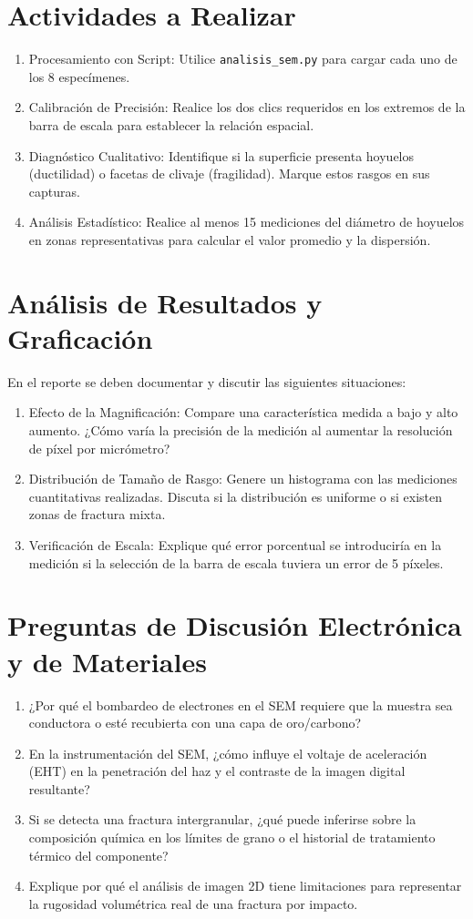 \documentclass[11pt, a4paper]{article}
\begin{document}
\section{Actividades a Realizar}
\begin{enumerate}
    \item Procesamiento con Script: Utilice \texttt{analisis\_sem.py} para cargar cada uno de los 8 especímenes.
    \item Calibración de Precisión: Realice los dos clics requeridos en los extremos de la barra de escala para establecer la relación espacial.
    \item Diagnóstico Cualitativo: Identifique si la superficie presenta hoyuelos (ductilidad) o facetas de clivaje (fragilidad). Marque estos rasgos en sus capturas.
    \item Análisis Estadístico: Realice al menos 15 mediciones del diámetro de hoyuelos en zonas representativas para calcular el valor promedio y la dispersión.
\end{enumerate}

\section{Análisis de Resultados y Graficación}
En el reporte se deben documentar y discutir las siguientes situaciones:
\begin{enumerate}
    \item Efecto de la Magnificación: Compare una característica medida a bajo y alto aumento. ¿Cómo varía la precisión de la medición al aumentar la resolución de píxel por micrómetro?
    \item Distribución de Tamaño de Rasgo: Genere un histograma con las mediciones cuantitativas realizadas. Discuta si la distribución es uniforme o si existen zonas de fractura mixta.
    \item Verificación de Escala: Explique qué error porcentual se introduciría en la medición si la selección de la barra de escala tuviera un error de 5 píxeles.
\end{enumerate}

\section{Preguntas de Discusión Electrónica y de Materiales}
\begin{enumerate}
    \item ¿Por qué el bombardeo de electrones en el SEM requiere que la muestra sea conductora o esté recubierta con una capa de oro/carbono?
    \item En la instrumentación del SEM, ¿cómo influye el voltaje de aceleración (EHT) en la penetración del haz y el contraste de la imagen digital resultante?
    \item Si se detecta una fractura intergranular, ¿qué puede inferirse sobre la composición química en los límites de grano o el historial de tratamiento térmico del componente?
    \item Explique por qué el análisis de imagen 2D tiene limitaciones para representar la rugosidad volumétrica real de una fractura por impacto.
\end{enumerate}
\end{document}
